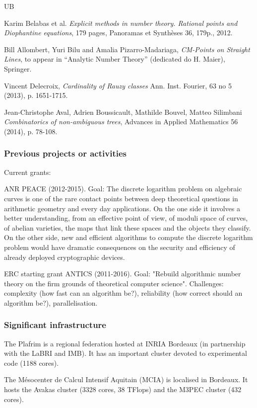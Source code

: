 \begin{sitedescription}{UB}
\begin{compactenum}
\item
Karim Belabas et al.
\textit{Explicit methods in number theory. Rational points and Diophantine equations},
179 pages, Panoramas et Synthèses 36, 179p., 2012.

\item
Bill Allombert, Yuri Bilu and Amalia Pizarro-Madariaga,
\textit{CM-Points on Straight Lines}, to appear in ``Analytic Number Theory'' (dedicated do H. Maier),
Springer.

\item
Vincent Delecroix,
\textit{Cardinality of Rauzy classes}
Ann. Inst. Fourier, 63 no 5 (2013), p. 1651-1715.

\item
Jean-Christophe Aval, Adrien Boussicault, Mathilde Bouvel, Matteo Silimbani
\textit{Combinatorics of non-ambiguous trees},
Advances in Applied Mathematics 56 (2014), p. 78-108.
\end{compactenum}

\subsubsection*{Previous projects or activities}

Current grants:
\begin{compactenum}
\item
 ANR PEACE (2012-2015).
    Goal: The discrete logarithm problem on algebraic curves is one of the rare
    contact points between deep theoretical questions in arithmetic geometry and
    every day applications. On the one side it involves a better understanding,
    from an effective point of view, of moduli space of curves, of abelian
    varieties, the maps that link these spaces and the objects they classify.
    On the other side, new and efficient algorithms to compute the discrete
    logarithm problem would have dramatic consequences on the security and
    efficiency of already deployed cryptographic devices. 

\item
ERC starting grant ANTICS (2011-2016).
    Goal: "Rebuild algorithmic number theory on the firm grounds of theoretical
    computer science".
    Challenges: complexity (how fast can an algorithm be?), reliability
    (how correct should an algorithm be?), parallelisation.
\end{compactenum}

\subsubsection*{Significant infrastructure}
\begin{compactenum}
\item The Plafrim is a regional federation hosted at INRIA Bordeaux (in partnership with the LaBRI and IMB). It has an important cluster devoted to experimental code (1188 cores).
\item The M\'esocenter de Calcul Intensif Aquitain (MCIA) is localised
in Bordeaux. It hosts the Avakas cluster (3328 cores,  38 TFlops) and the
M3PEC cluster (432 cores).
\end{compactenum}


\end{sitedescription}
